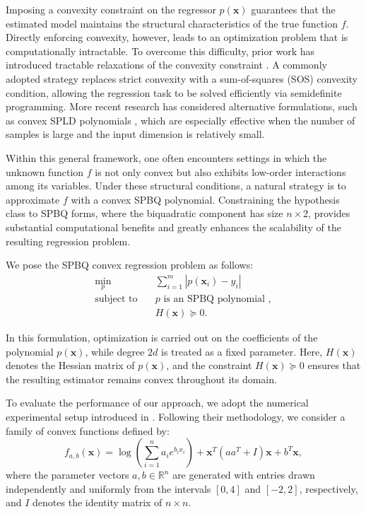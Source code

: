 \documentclass[12pt]{elsarticle}
\theoremstyle{definition}
\begin{document}
Imposing a convexity constraint on the regressor $p(\mathbf{x})$ guarantees that the estimated model maintains the structural characteristics of the true function $f$. 
Directly enforcing convexity, however, leads to an optimization problem that is computationally intractable. 
To overcome this difficulty, prior work has introduced tractable relaxations of the convexity constraint \cite{hildreth1954point, magnani2005tractable, curmei2025shape}. 
A commonly adopted strategy replaces strict convexity with a sum-of-squares (SOS) convexity condition, 
allowing the regression task to be solved efficiently via semidefinite programming. 
More recent research has considered alternative formulations, such as convex SPLD polynomials \cite{jiao2026spld}, 
which are especially effective when the number of samples is large and the input dimension is relatively small.

Within this general framework, one often encounters settings in which the unknown function 
$f$ is not only convex but also exhibits low-order interactions among its variables. 
Under these structural conditions, a natural strategy is to approximate $f$ with 
a convex SPBQ polynomial. Constraining the hypothesis class to SPBQ forms, where the biquadratic component has size $n\times 2$, provides 
substantial computational benefits and greatly enhances the scalability of 
the resulting regression problem.

We pose the SPBQ convex regression problem as follows:
\begin{equation}\label{spbq cons}
\begin{aligned}
\min_{p} \quad & \sum_{i=1}^m \left| p(\mathbf{x}_i) - y_i \right| \\
\text{subject to} \quad 
& p \text{ is an SPBQ polynomial }, \\
& H(\mathbf{x}) \succeq 0 .
\end{aligned}
\end{equation}

In this formulation, optimization is carried out on the coefficients of the 
polynomial $p(\mathbf{x})$, while degree $2d$ is treated as a fixed parameter. 
Here, $H(\mathbf{x})$ denotes the Hessian matrix of $p(\mathbf{x})$, and the constraint 
$H(\mathbf{x}) \succeq 0$ ensures that the resulting estimator remains convex throughout its domain.

To evaluate the performance of our approach, we adopt the numerical experimental setup introduced in \cite{ahmadi2023sums}. Following their methodology, we consider a family of convex functions defined by:
\begin{equation}
f_{a,b}(\mathbf{x}) =
\log\!\left(\sum_{i=1}^{n} a_i e^{b_i x_i}\right)
+ \mathbf{x}^T (aa^T + I)\mathbf{x}
+ b^T \mathbf{x},
\end{equation}
where the parameter vectors $a, b \in \mathbb{R}^n$ are generated with entries drawn independently and uniformly from the intervals $[0,4]$ and $[-2,2]$, respectively, and $I$ denotes the identity matrix of $n \times n$.
\end{document}
